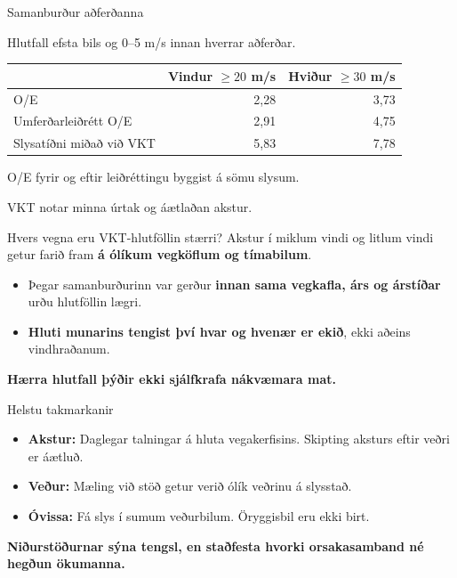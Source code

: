\documentclass[aspectratio=169,12pt,t]{beamer}
\begin{document}
\begin{frame}{Samanburður aðferðanna}
\relax
{\small Hlutfall efsta bils og 0--5 m/s innan hverrar aðferðar.\par}
\vspace{3mm}
\renewcommand{\arraystretch}{1.45}
\begin{tabular}{@{}lrr@{}}\toprule
& \shortstack{Vindur\\$\geq20$ m/s} & \shortstack{Hviður\\$\geq30$ m/s}\\\midrule
O/E & 2,28 & 3,73\\
Umferðarleiðrétt O/E & 2,91 & 4,75\\
Slysatíðni miðað við VKT & 5,83 & 7,78\\\bottomrule
\end{tabular}\par
\vspace{5mm}
{\small O/E fyrir og eftir leiðréttingu byggist á sömu slysum.\par
VKT notar minna úrtak og áætlaðan akstur.\par}
\end{frame}

\begin{frame}{Hvers vegna eru VKT-hlutföllin stærri?}
\relax
Akstur í miklum vindi og litlum vindi getur farið fram \textbf{á ólíkum vegköflum og tímabilum}.\par
\vspace{3mm}
\begin{itemize}\points
\item Þegar samanburðurinn var gerður \textbf{innan sama vegkafla, árs og árstíðar} urðu hlutföllin lægri.
\item \textbf{Hluti munarins tengist því hvar og hvenær er ekið}, ekki aðeins vindhraðanum.
\end{itemize}
\vspace{3mm}
\textbf{Hærra hlutfall þýðir ekki sjálfkrafa nákvæmara mat.}
\end{frame}

\begin{frame}{Helstu takmarkanir}
\relax
\begin{itemize}\points
\item \textbf{Akstur:} Daglegar talningar á hluta vegakerfisins. Skipting aksturs eftir veðri er áætluð.
\item \textbf{Veður:} Mæling við stöð getur verið ólík veðrinu á slysstað.
\item \textbf{Óvissa:} Fá slys í sumum veðurbilum. Öryggisbil eru ekki birt.
\end{itemize}
\vspace{3mm}
\textbf{Niðurstöðurnar sýna tengsl, en staðfesta hvorki orsakasamband né hegðun ökumanna.}
\end{frame}
\end{document}
